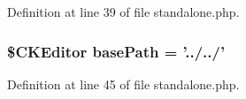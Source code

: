 Definition at line 39 of file standalone.php.

\hypertarget{standalone_8php_a94a267f018012b013582daafb6a89618}{
\subsubsection[{basePath}]{\setlength{\rightskip}{0pt plus 5cm}\${\bf CKEditor} {\bf basePath} = '../../'}}
\label{standalone_8php_a94a267f018012b013582daafb6a89618}


Definition at line 45 of file standalone.php.

